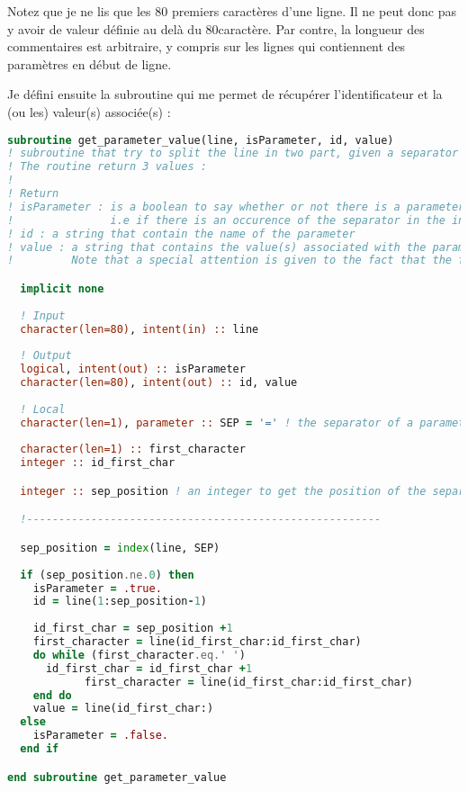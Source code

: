 \begin{attention}
Notez que je ne lis que les 80 premiers caractères d'une ligne. Il ne peut donc pas y avoir de valeur définie au delà du 80\ieme caractère. Par contre, la longueur des commentaires est arbitraire, y compris sur les lignes qui contiennent des paramètres en début de ligne.
\end{attention}


Je défini ensuite la subroutine qui me permet de récupérer l'identificateur et la (ou les) valeur(s) associée(s) : 
\begin{lstlisting}[language=Fortran]
subroutine get_parameter_value(line, isParameter, id, value)
! subroutine that try to split the line in two part, given a separator value (set in parameter of the subroutine)
! The routine return 3 values : 
!
! Return
! isParameter : is a boolean to say whether or not there is a parameter on this line. 
!               i.e if there is an occurence of the separator in the input line
! id : a string that contain the name of the parameter
! value : a string that contains the value(s) associated with the parameter name. 
!         Note that a special attention is given to the fact that the first character of 'value' must NOT be a 'space'

  implicit none
  
  ! Input
  character(len=80), intent(in) :: line
  
  ! Output
  logical, intent(out) :: isParameter
  character(len=80), intent(out) :: id, value
  
  ! Local
  character(len=1), parameter :: SEP = '=' ! the separator of a parameter line
  
  character(len=1) :: first_character
  integer :: id_first_char

  integer :: sep_position ! an integer to get the position of the separator

  !-------------------------------------------------------

  sep_position = index(line, SEP)
  
  if (sep_position.ne.0) then
    isParameter = .true.
    id = line(1:sep_position-1)
    
    id_first_char = sep_position +1
    first_character = line(id_first_char:id_first_char)
    do while (first_character.eq.' ')
      id_first_char = id_first_char +1
			first_character = line(id_first_char:id_first_char)
    end do
    value = line(id_first_char:)
  else
    isParameter = .false.
  end if

end subroutine get_parameter_value
\end{lstlisting}

